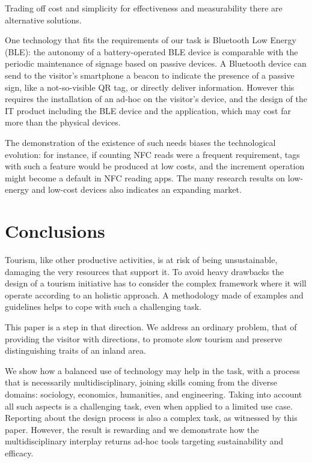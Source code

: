 \documentclass[sustainability,article,submit,pdftex,moreauthors]{Definitions/mdpi}
\begin{document}
Trading off cost and simplicity for effectiveness and measurability there are alternative solutions.

One technology that fits the requirements of our task is Bluetooth Low Energy (BLE): the autonomy of a battery-operated BLE device is comparable with the periodic maintenance of signage based on passive devices. A Bluetooth device can send to the visitor's smartphone a beacon to indicate the presence of a passive sign, like a not-so-visible QR tag, or directly deliver information. However this requires the installation of an ad-hoc on the visitor's device, and the design of the IT product including the BLE device and the application, which may cost far more than the physical devices. 

The demonstration of the existence of such needs biases the technological evolution: for instance, if counting NFC reads were a frequent requirement, tags with such a feature would be produced at low costs, and the increment operation might become a default in NFC reading apps. The many research results on low-energy and low-cost devices also indicates an expanding market.

\section{Conclusions}

Tourism, like other productive activities, is at risk of being unsustainable, damaging the very resources that support it. To avoid heavy drawbacks the design of a tourism initiative has to consider the complex framework where it will operate according to an holistic approach. A methodology made of examples and guidelines helps to cope with such a challenging task.

This paper is a step in that direction. We address an ordinary problem, that of providing the visitor with directions, to promote slow tourism and preserve distinguishing traits of an inland area.

We show how a balanced use of technology may help in the task, with a process that is necessarily multidisciplinary, joining skills coming from the diverse domains: sociology, economics, humanities, and engineering. Taking into account all such aspects is a challenging task, even when applied to a limited use case. Reporting about the design process is also a complex task, as witnessed by this paper. However, the result is rewarding and we demonstrate how the multidisciplinary interplay returns ad-hoc tools targeting sustainability and efficacy.
\end{document}
